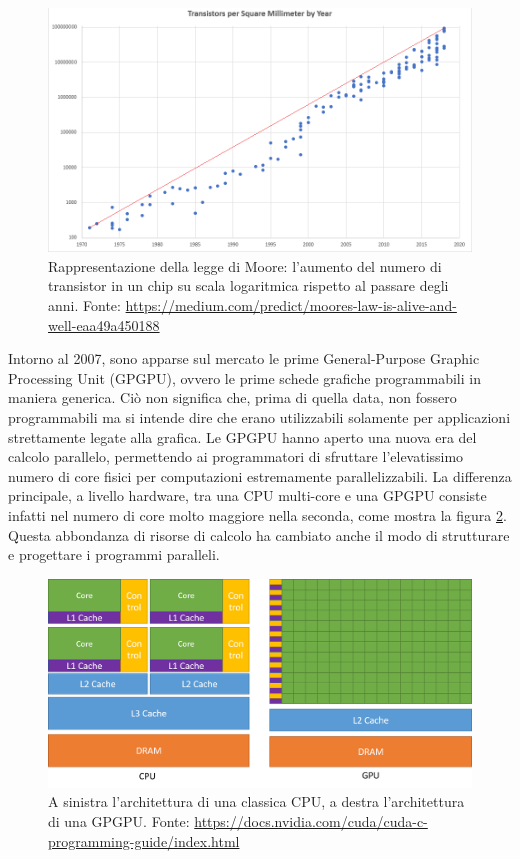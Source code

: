 \documentclass[12pt,a4paper,oneside]{book}
\begin{document}
	\begin{figure}[!ht]
		\centering
		\includegraphics[width=0.76\linewidth]{Moores_Law}
		\caption[Legge di Moore]{Rappresentazione della legge di Moore: l'aumento del numero di transistor in un chip su scala logaritmica rispetto al passare degli anni. Fonte: \url{https://medium.com/predict/moores-law-is-alive-and-well-eaa49a450188}}
		\label{fig:mooreslaw}
	\end{figure}
	
	Intorno al 2007, sono apparse sul mercato le prime General-Purpose Graphic Processing Unit (GPGPU), ovvero le prime schede grafiche programmabili in maniera generica. Ciò non significa che, prima di quella data, non fossero programmabili ma si intende dire che erano utilizzabili solamente per applicazioni strettamente legate alla grafica. Le GPGPU hanno aperto una nuova era del calcolo parallelo, permettendo ai programmatori di sfruttare l'elevatissimo numero di core fisici per computazioni estremamente parallelizzabili. La differenza principale, a livello hardware, tra una CPU multi-core e una GPGPU consiste infatti nel numero di core molto maggiore nella seconda, come mostra la figura \ref{fig:cpu-gpu-computing-architecture}. Questa abbondanza di risorse di calcolo ha cambiato anche il modo di strutturare e progettare i programmi paralleli.
	
	\begin{figure}[!ht]
		\centering
		\includegraphics[width=\linewidth]{cpu-gpu-computing-architecture}
		\caption[Differenza architetturale tra CPU e GPU]{A sinistra l'architettura di una classica CPU, a destra l'architettura di una GPGPU. Fonte: \url{https://docs.nvidia.com/cuda/cuda-c-programming-guide/index.html}}
		\label{fig:cpu-gpu-computing-architecture}
	\end{figure}
	
\end{document}
